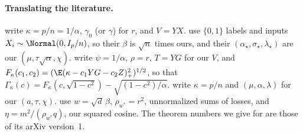 \begin{refsection}
\paragraph{Translating the literature.} \Textcite{CandesSur2020} write $\kappa=p/n=1/\alpha$, $\gamma_0$ (or $\gamma$) for $r$, and $V=YX$. \Textcite{SurCandes2019} use $\{0,1\}$ labels and inputs $X_i\sim\Normal(0,I_p/n)$, so their $\beta$ is $\sqrt n$ times ours, and their $(\alpha_\star,\sigma_\star,\lambda_\star)$ are our $(\mu,\tau\sqrt\alpha,\chi)$. \Textcite{MontanariEtAl2025} write $\psi=1/\alpha$, $\rho=r$, $T=YG$ for our $V$, and $F_\kappa(c_1,c_2)=(\E(\kappa-c_1YG-c_2Z)_+^2)^{1/2}$, so that $\Gamma_\kappa(c)=F_\kappa(c,\sqrt{1-c^2})-\sqrt{(1-c^2)/\alpha}$. \Textcite{DengKammounThrampoulidis2022} write $\kappa=p/n$ and $(\mu,\alpha,\lambda)$ for our $(a,\tau,\chi)$. \Textcite{AubinEtAl2020} use $w=\sqrt d\,\beta$, $\rho_{w^*}=r^2$, unnormalized sums of losses, and $\eta=m^2/(\rho_{w^*}q)$, our squared cosine. The theorem numbers we give for \textcite{ThrampoulidisAbbasiHassibi2018} are those of its arXiv version~1.
\printchapterbib
\end{refsection}
